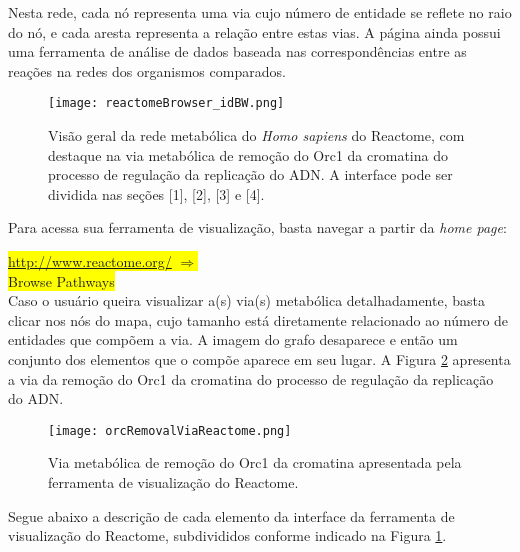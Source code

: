 \indent Nesta rede, cada nó representa uma via cujo número de entidade se reflete no raio do nó, e cada aresta representa a relação entre estas vias. A página ainda possui uma ferramenta de análise de dados baseada nas correspondências entre as reações na redes dos organismos comparados.

\begin{figure}[!h]
\centering
\texttt{[image: reactomeBrowser\_idBW.png]}
\caption{Visão geral da rede metabólica do \textit{Homo sapiens} do Reactome, com destaque na via metabólica de remoção do Orc1 da cromatina do processo de regulação da replicação do ADN. A interface pode ser dividida nas seções [1], [2], [3] e [4].}
\label{reactomeBrowser_id}
\end{figure}

\indent Para acessa sua ferramenta de visualização, basta navegar a partir da \textit{home page}:

\indent \colorbox{yellow}{\url{http://www.reactome.org/} $\Rightarrow$} \\
\indent \colorbox{yellow}{Browse Pathways} \\

\indent Caso o usuário queira visualizar a(s) via(s) metabólica detalhadamente, basta clicar nos nós do mapa, cujo tamanho está diretamente relacionado ao número de entidades que compõem a via. A imagem do grafo desaparece e então um conjunto dos elementos que o compõe aparece em seu lugar. A Figura \ref{orcRemovalViaReactome} apresenta a via da remoção do Orc1 da cromatina do processo de regulação da replicação do ADN.

\begin{figure}[!h]
\centering
\texttt{[image: orcRemovalViaReactome.png]}
\caption{Via metabólica de remoção do Orc1 da cromatina apresentada pela ferramenta de visualização do Reactome.}
\label{orcRemovalViaReactome}
\end{figure}

\indent Segue abaixo a descrição de cada elemento da interface da ferramenta de visualização do Reactome, subdivididos  conforme indicado na Figura \ref{reactomeBrowser_id}.

